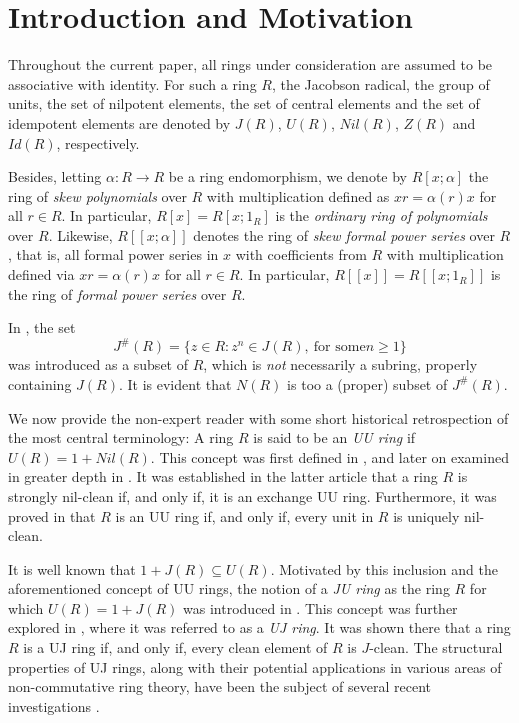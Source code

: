 \documentclass[12pt]{amsart}
\theoremstyle{definition}
\begin{document}
\section{Introduction and Motivation}

Throughout the current paper, all rings under consideration are assumed to be associative with identity. For such a ring $R$, the Jacobson radical, the group of units, the set of nilpotent elements, the set of central elements and the set of idempotent elements are denoted by $J(R)$, $U(R)$, $Nil(R)$, $Z(R)$ and $Id(R)$, respectively.

Besides, letting $\alpha : R \to R$ be a ring endomorphism, we denote by $R[x; \alpha]$ the ring of {\it skew polynomials} over $R$ with multiplication defined as $xr = \alpha(r)x$ for all $r \in R$. In particular, $R[x] = R[x; 1_R]$ is the {\it ordinary ring of polynomials} over $R$. Likewise, $R[[x; \alpha]]$ denotes the ring of {\it skew formal power series} over $R$, that is, all formal power series in $x$ with coefficients from $R$ with multiplication defined via $xr = \alpha(r)x$ for all $r \in R$. In particular, $R[[x]] = R[[x; 1_R]]$ is the ring of {\it formal power series} over $R$.

In \cite{wang}, the set \[J^{\#}(R)=\{z\in R : z^n\in J(R),\ \text{for some} n\ge 1\}\] was introduced as a subset of \(R\), which is {\it not} necessarily a subring, properly containing $J(R)$. It is evident that $N(R)$ is too a (proper) subset of $J^{\#}(R)$.

We now provide the non-expert reader with some short historical retrospection of the most central terminology: A ring $R$ is said to be an {\it UU ring} if $U(R) = 1 + Nil(R)$. This concept was first defined in \cite{CUU}, and later on examined in greater depth in \cite{DL}. It was established in the latter article that a ring $R$ is strongly nil-clean if, and only if, it is an exchange UU ring. Furthermore, it was proved in \cite{karimi} that $R$ is an UU ring if, and only if, every unit in $R$ is uniquely nil-clean.

It is well known that $1 + J(R) \subseteq U(R)$. Motivated by this inclusion and the aforementioned concept of UU rings, the notion of a {\it JU ring} as the ring $R$ for which $U(R) = 1 + J(R)$ was introduced in \cite{Drings}. This concept was further explored in \cite{kosan1}, where it was referred to as a {\it UJ ring}. It was shown there that a ring $R$ is a UJ ring if, and only if, every clean element of $R$ is $J$-clean. The structural properties of UJ rings, along with their potential applications in various areas of non-commutative ring theory, have been the subject of several recent investigations \cite{Drings,kosan1,kosannot,leroy}.
\end{document}
